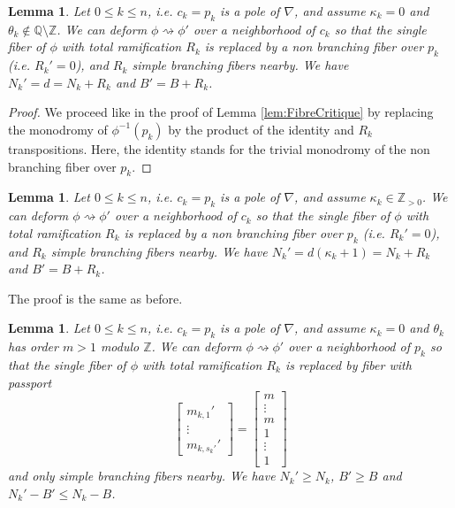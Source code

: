 \documentclass[12]{amsart}
\newtheorem{lem}[thm]{Lemma}
\begin{document}
\begin{lem}\label{lem:FibreNonPeriodic}
Let $0\le k\le n$, i.e. $c_k=p_k$ is a pole of $\nabla$, and assume $\kappa_k=0$ 
and $\theta_k\not\in\mathbb Q\setminus\mathbb Z$.
We can deform $\phi\rightsquigarrow\phi'$ over a neighborhood of $c_k$ so that
the single fiber of $\phi$ with total ramification $R_k$ is replaced by a non branching fiber
over $p_k$ (i.e. $R_k'=0$), and $R_k$ simple branching fibers nearby.
We have $N_k'=d=N_k+R_k$ and $B'=B+R_k$.
\end{lem}

\begin{proof}We proceed like in the proof of Lemma \ref{lem:FibreCritique} by replacing 
the monodromy of $\phi^{-1}(p_k)$ by the product of the identity and $R_k$ transpositions.
Here, the identity stands for the trivial monodromy of the non branching fiber over $p_k$.
\end{proof}

\begin{lem}\label{lem:FibreIrregUnram}
Let $0\le k\le n$, i.e. $c_k=p_k$ is a pole of $\nabla$, and assume $\kappa_k\in\mathbb Z_{>0}$.
We can deform $\phi\rightsquigarrow\phi'$ over a neighborhood of $c_k$ so that
the single fiber of $\phi$ with total ramification $R_k$ is replaced by a non branching fiber
over $p_k$ (i.e. $R_k'=0$), and $R_k$ simple branching fibers nearby.
We have $N_k'=d(\kappa_k+1)=N_k+R_k$ and $B'=B+R_k$.
\end{lem}

The proof is the same as before.

\begin{lem}\label{lem:FibrePeriodic}
Let $0\le k\le n$, i.e. $c_k=p_k$ is a pole of $\nabla$, and assume $\kappa_k=0$
and $\theta_k$ has order $m>1$ modulo $\mathbb Z$.
We can deform $\phi\rightsquigarrow\phi'$ over a neighborhood of $p_k$ so that
the single fiber of $\phi$ with total ramification $R_k$ is replaced by fiber with passport
$$\left[\begin{matrix}m_{k,1}'\\  \vdots\\ m_{k,s_k'}'\end{matrix}\right]=\left[\begin{matrix}m\\ \vdots\\ m\\ 1\\ \vdots\\ 1\end{matrix}\right]$$
and only simple branching fibers nearby.
We have $N_k'\ge N_k$, $B'\ge B$ and $N_k'-B'\le N_k-B$.
\end{lem}
\end{document}
